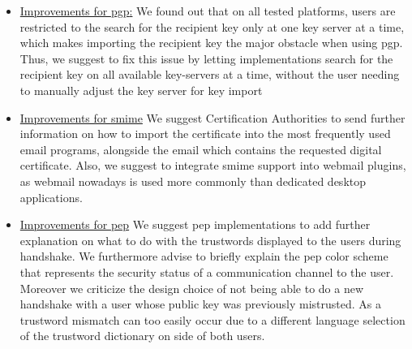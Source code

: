 \begin{itemize}
	\item \underline{Improvements for \acrshort{pgp}:}\newline
	We found out that on all tested platforms, users are restricted to the search for the recipient key only at one key server at a time, which makes importing the recipient key the major obstacle when using \acrshort{pgp}. Thus, we suggest to fix this issue by letting implementations search for the recipient key on all available key-servers at a time, without the user needing to manually adjust the key server for key import
	\item \underline{Improvements for \acrshort{smime}}\newline
	We suggest Certification Authorities to send further information on how to import the certificate into the most frequently used email programs, alongside the email which contains the requested digital certificate. Also, we suggest to integrate \acrshort{smime} support into webmail plugins, as webmail nowadays is used more commonly than dedicated desktop applications.
	\item \underline{Improvements for \acrshort{pep}}\newline
	We suggest \acrshort{pep} implementations to add further explanation on what to do with the trustwords displayed to the users during handshake. We furthermore advise to briefly explain the \acrshort{pep} color scheme that represents the security status of a communication channel to the user.
	Moreover we criticize the design choice of not being able to do a new handshake with a user whose public key was previously mistrusted. As a trustword mismatch can too easily occur due to a different language selection of the trustword dictionary on side of both users.	
\end{itemize}